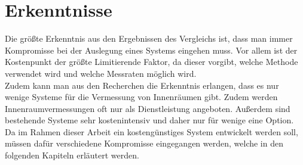 \section{Erkenntnisse}
Die größte Erkenntnis aus den Ergebnissen des Vergleichs ist, dass man immer Kompromisse bei der Auslegung eines Systems eingehen muss. Vor allem ist der Kostenpunkt der größte Limitierende Faktor, da dieser vorgibt, welche Methode verwendet wird und welche Messraten möglich wird. \\
Zudem kann man aus den Recherchen die Erkenntnis erlangen, dass es nur wenige Systeme für die Vermessung von Innenräumen gibt. Zudem werden Innenraumvermessungen oft nur als Dienstleistung angeboten. Außerdem sind bestehende Systeme sehr kostenintensiv und daher nur für wenige eine Option.\\
Da im Rahmen dieser Arbeit ein kostengünstiges System entwickelt werden soll, müssen dafür verschiedene Kompromisse eingegangen werden, welche in den folgenden Kapiteln erläutert werden.
